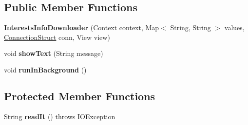 \subsection*{Public Member Functions}
\begin{DoxyCompactItemize}
\item 
{\bfseries Interests\+Info\+Downloader} (Context context, Map$<$ String, String $>$ values, \hyperlink{classcom_1_1example_1_1sebastian_1_1tindertp_1_1commonTools_1_1ConnectionStruct}{Connection\+Struct} conn, View view)\hypertarget{classcom_1_1example_1_1sebastian_1_1tindertp_1_1internetTools_1_1InterestsInfoDownloader_aee72fc71503df138a1186b5d63b9eca6}{}\label{classcom_1_1example_1_1sebastian_1_1tindertp_1_1internetTools_1_1InterestsInfoDownloader_aee72fc71503df138a1186b5d63b9eca6}

\item 
void {\bfseries show\+Text} (String message)\hypertarget{classcom_1_1example_1_1sebastian_1_1tindertp_1_1internetTools_1_1InterestsInfoDownloader_a83027f8e3fb29b5762878f0bb8da6e67}{}\label{classcom_1_1example_1_1sebastian_1_1tindertp_1_1internetTools_1_1InterestsInfoDownloader_a83027f8e3fb29b5762878f0bb8da6e67}

\item 
void {\bfseries run\+In\+Background} ()\hypertarget{classcom_1_1example_1_1sebastian_1_1tindertp_1_1internetTools_1_1InterestsInfoDownloader_a515bd091b8fa5405cae8bcd9a1e5dc5a}{}\label{classcom_1_1example_1_1sebastian_1_1tindertp_1_1internetTools_1_1InterestsInfoDownloader_a515bd091b8fa5405cae8bcd9a1e5dc5a}

\end{DoxyCompactItemize}
\subsection*{Protected Member Functions}
\begin{DoxyCompactItemize}
\item 
String {\bfseries read\+It} ()  throws I\+O\+Exception \hypertarget{classcom_1_1example_1_1sebastian_1_1tindertp_1_1internetTools_1_1InterestsInfoDownloader_a31b55d59c812bc1835b672daf147fddc}{}\label{classcom_1_1example_1_1sebastian_1_1tindertp_1_1internetTools_1_1InterestsInfoDownloader_a31b55d59c812bc1835b672daf147fddc}

\end{DoxyCompactItemize}
